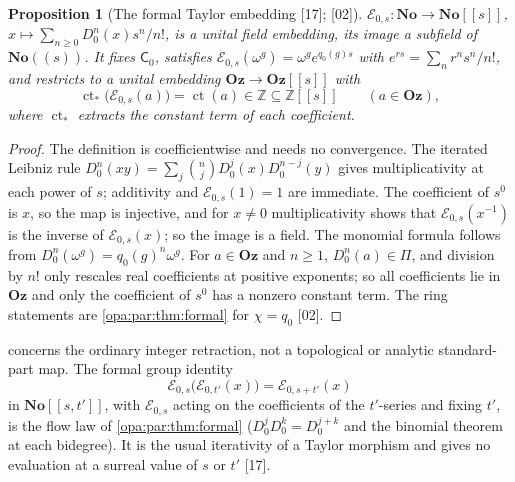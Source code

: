 \documentclass[11pt,oneside]{article}
\numberwithin{equation}{section}
\newtheorem{proposition}[proposition]{Proposition}
\theoremstyle{definition}
\theoremstyle{remark}
\newcommand{\No}{\mathbf{No}}
\newcommand{\Oz}{\mathbf{Oz}}
\newcommand{\Z}{\mathbb Z}
\newcommand{\EE}{\mathcal E}
\newcommand{\ct}{\operatorname{ct}}
\newcommand{\src}[1]{\textup{\textsf{\small[#1]}}}
\begin{document}
\begin{proposition}[The formal Taylor embedding \src{17}; \src{02}]\label{opa:of:prop:T}
$\EE_{0,s}:\No\to\No[[s]]$, $x\mapsto\sum_{n\ge0}D_0^n(x)s^n/n!$, is a unital field embedding, its image a subfield of
$\No((s))$. It fixes $\mathsf C_0$, satisfies $\EE_{0,s}(\omega^g)=\omega^ge^{q_0(g)s}$ with $e^{rs}=\sum_nr^ns^n/n!$, and
restricts to a unital embedding $\Oz\to\Oz[[s]]$ with
\begin{equation}\label{opa:of:eq:ctT}
 \ct_*\bigl(\EE_{0,s}(a)\bigr)=\ct(a)\in\Z\subseteq\Z[[s]]\qquad(a\in\Oz),
\end{equation}
where $\ct_*$ extracts the constant term of each coefficient.
\end{proposition}
\begin{proof}
The definition is coefficientwise and needs no convergence. The iterated Leibniz rule
$D_0^n(xy)=\sum_j\binom njD_0^j(x)D_0^{n-j}(y)$ gives multiplicativity at each power of $s$; additivity and $\EE_{0,s}(1)=1$ are
immediate. The coefficient of $s^0$ is $x$, so the map is injective, and for $x\ne0$ multiplicativity shows that
$\EE_{0,s}(x^{-1})$ is the inverse of $\EE_{0,s}(x)$; so the image is a field. The monomial formula follows from
$D_0^n(\omega^g)=q_0(g)^n\omega^g$. For $a\in\Oz$ and $n\ge1$, $D_0^n(a)\in\Pi$, and division by $n!$ only rescales real
coefficients at positive exponents; so all coefficients lie in $\Oz$ and only the coefficient of $s^0$ has a nonzero constant
term. The ring statements are \cref{opa:par:thm:formal} for $\chi=q_0$ \src{02}.
\end{proof}

 concerns the ordinary integer retraction, not a topological or analytic standard-part map. The formal
group identity
\begin{equation}\label{opa:of:eq:flowlaw}
 \EE_{0,s}\bigl(\EE_{0,t'}(x)\bigr)=\EE_{0,s+t'}(x)
\end{equation}
in $\No[[s,t']]$, with $\EE_{0,s}$ acting on the coefficients of the $t'$-series and fixing $t'$, is the flow law of
\cref{opa:par:thm:formal} ($D_0^jD_0^k=D_0^{j+k}$ and the binomial theorem at each bidegree). It is the usual iterativity of a
Taylor morphism and gives no evaluation at a surreal value of $s$ or $t'$ \src{17}.
\end{document}
